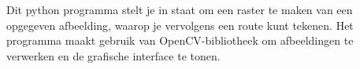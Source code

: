 Dit python programma stelt je in staat om een raster te maken van een opgegeven afbeelding, waarop je vervolgens een route kunt tekenen. Het programma maakt gebruik van Open\+CV-\/bibliotheek om afbeeldingen te verwerken en de grafische interface te tonen. 